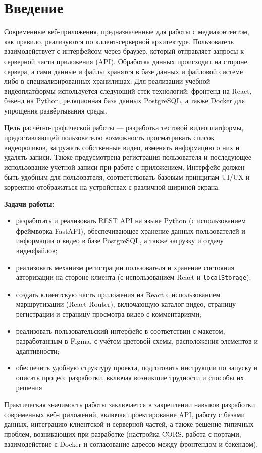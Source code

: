 \chapter{Введение}

Современные веб-приложения, предназначенные для работы с медиаконтентом, как правило, реализуются по клиент-серверной архитектуре. Пользователь взаимодействует с интерфейсом через браузер, который отправляет запросы к серверной части приложения (API). Обработка данных происходит на стороне сервера, а сами данные и файлы хранятся в базе данных и файловой системе либо в специализированных хранилищах. Для реализации учебной видеоплатформы используется следующий стек технологий: фронтенд на React, бэкенд на Python, реляционная база данных PostgreSQL, а также Docker для упрощения развёртывания среды.

\textbf{Цель} расчётно-графической работы — разработка тестовой видеоплатформы, предоставляющей пользователю возможность просматривать список видеороликов, загружать собственные видео, изменять информацию о них и удалять записи. Также предусмотрена регистрация пользователя и последующее использование учётной записи при работе с приложением. Интерфейс должен быть удобным для пользователя, соответствовать базовым принципам UI/UX и корректно отображаться на устройствах с различной шириной экрана.

\textbf{Задачи работы:}
\begin{itemize}
    \item разработать и реализовать REST API на языке Python (с использованием фреймворка FastAPI), обеспечивающее хранение данных пользователей и информации о видео в базе PostgreSQL, а также загрузку и отдачу видеофайлов;
    \item реализовать механизм регистрации пользователя и хранение состояния авторизации на стороне клиента (с использованием React и \texttt{localStorage});
    \item создать клиентскую часть приложения на React с использованием маршрутизации (React Router), включающую каталог видео, страницу регистрации и страницу просмотра видео с комментариями;
    \item реализовать пользовательский интерфейс в соответствии с макетом, разработанным в Figma, с учётом цветовой схемы, расположения элементов и адаптивности;
    \item обеспечить удобную структуру проекта, подготовить инструкции по запуску и описать процесс разработки, включая возникшие трудности и способы их решения.
\end{itemize}

Практическая значимость работы заключается в закреплении навыков разработки современных веб-приложений, включая проектирование API, работу с базами данных, интеграцию клиентской и серверной частей, а также решение типичных проблем, возникающих при разработке (настройка CORS, работа с портами, взаимодействие с Docker и согласование адресов между фронтендом и бэкендом).